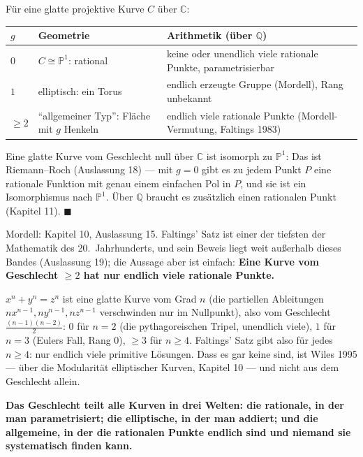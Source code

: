 \begin{merksatz}
Für eine glatte projektive Kurve $C$ über $\mathbb C$:
\begin{center}
{\small
\renewcommand{\arraystretch}{1.5}
\begin{tabular}{@{}P{1.4cm}P{3.0cm}P{4.2cm}@{}}
\toprule
$g$ & \textbf{Geometrie} & \textbf{Arithmetik (über $\mathbb Q$)}\\
\midrule
$0$ & $C\cong\mathbb P^{1}$: rational & keine oder unendlich viele rationale Punkte, parametrisierbar\\
$1$ & elliptisch: ein Torus & endlich erzeugte Gruppe (Mordell), Rang unbekannt\\
$\ge2$ & \enquote{allgemeiner Typ}: Fläche mit $g$ Henkeln & endlich viele rationale Punkte (Mordell-Vermutung, Faltings 1983)\\
\bottomrule
\end{tabular}}
\end{center}

Eine glatte Kurve vom Geschlecht null über $\mathbb C$ ist isomorph zu $\mathbb P^{1}$: Das ist Riemann--Roch (Auslassung 18) --- mit $g = 0$ gibt es zu jedem Punkt $P$ eine rationale Funktion mit genau einem einfachen Pol in $P$, und sie ist ein Isomorphismus nach $\mathbb P^{1}$. Über $\mathbb Q$ braucht es zusätzlich einen rationalen Punkt (Kapitel 11). $\blacksquare$

Mordell: Kapitel 10, Auslassung 15. Faltings' Satz ist einer der tiefsten der Mathematik des 20.\ Jahrhunderts, und sein Beweis liegt weit außerhalb dieses Bandes (Auslassung 19); die Aussage aber ist einfach: \textbf{Eine Kurve vom Geschlecht $\ge2$ hat nur endlich viele rationale Punkte.}

$x^{n} + y^{n} = z^{n}$ ist eine glatte Kurve vom Grad $n$ (die partiellen Ableitungen $nx^{n-1}, ny^{n-1}, nz^{n-1}$ verschwinden nur im Nullpunkt), also vom Geschlecht $\frac{(n-1)(n-2)}{2}$: $0$ für $n = 2$ (die pythagoreischen Tripel, unendlich viele), $1$ für $n = 3$ (Eulers Fall, Rang $0$), $\ge3$ für $n\ge4$. Faltings' Satz gibt also für jedes $n\ge4$: nur endlich viele primitive Lösungen. Dass es gar keine sind, ist Wiles 1995 --- über die Modularität elliptischer Kurven, Kapitel 10 --- und nicht aus dem Geschlecht allein.

\begin{center}
\begin{minipage}{0.9\textwidth}
\textbf{Das Geschlecht teilt alle Kurven in drei Welten: die rationale, in der man parametrisiert; die elliptische, in der man addiert; und die allgemeine, in der die rationalen Punkte endlich sind und niemand sie systematisch finden kann.}
\end{minipage}
\end{center}


\end{merksatz}
